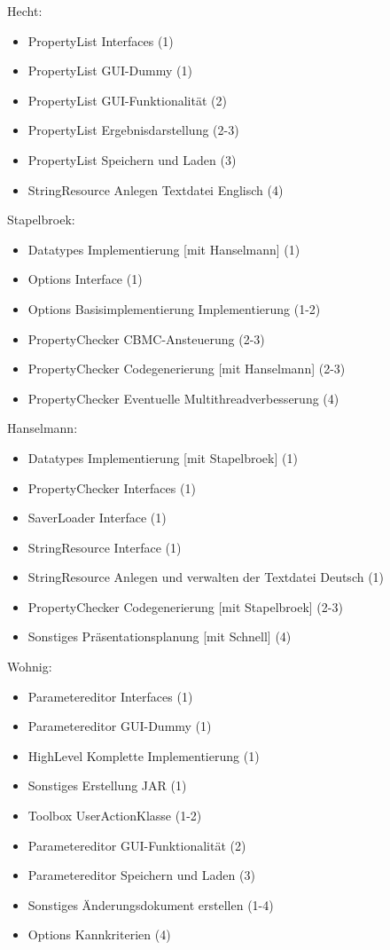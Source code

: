 \documentclass[a4paper]{scrreprt}
\begin{document}
\vspace{8mm}
Hecht: 
\begin{itemize}
\item PropertyList Interfaces (1)
\item PropertyList GUI-Dummy (1)
\item PropertyList GUI-Funktionalität (2)
\item PropertyList Ergebnisdarstellung (2-3)
\item PropertyList Speichern und Laden (3)
\item StringResource Anlegen Textdatei Englisch (4)
\end{itemize} 
\vspace{8mm}
Stapelbroek:
\begin{itemize}
\item Datatypes Implementierung [mit Hanselmann] (1)
\item Options Interface (1)
\item Options Basisimplementierung Implementierung (1-2)
\item PropertyChecker CBMC-Ansteuerung (2-3) 
\item PropertyChecker Codegenerierung [mit Hanselmann] (2-3) 
\item PropertyChecker Eventuelle Multithreadverbesserung (4)
\end{itemize}
\vspace{8mm}
Hanselmann:
\begin{itemize}
\item Datatypes Implementierung [mit Stapelbroek] (1)
\item PropertyChecker Interfaces (1)
\item SaverLoader Interface (1)
\item StringResource Interface (1)
\item StringResource Anlegen und verwalten der Textdatei Deutsch (1)
\item PropertyChecker Codegenerierung [mit Stapelbroek] (2-3)
\item Sonstiges Präsentationsplanung [mit Schnell] (4)
\end{itemize}
\vspace{8mm}
Wohnig:
\begin{itemize}
\item Parametereditor Interfaces (1)
\item Parametereditor GUI-Dummy (1)
\item HighLevel Komplette Implementierung (1)
\item Sonstiges Erstellung JAR (1)
\item Toolbox UserActionKlasse (1-2)
\item Parametereditor GUI-Funktionalität (2)
\item Parametereditor Speichern und Laden (3)
\item Sonstiges Änderungsdokument erstellen (1-4)
\item Options Kannkriterien (4)
\end{itemize}
\end{document}
